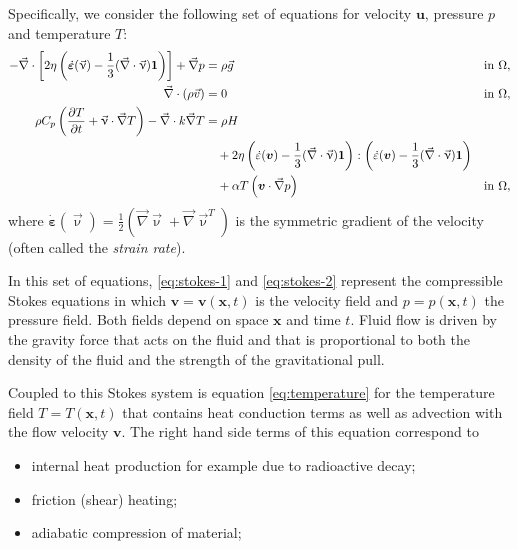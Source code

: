 Specifically, we consider the following set of equations for velocity $\mathbf
u$, pressure $p$ and temperature $T$:
\begin{align}
  \label{eq:stokes-1}
  -\vec\nabla \cdot \left[2\eta \left(\dot{\bm \varepsilon}(\vec \upnu)
                                  - \frac{1}{3}(\vec\nabla \cdot \vec \upnu)\mathbf 1\right)
                \right] + \vec\nabla p &=
  \rho \vec g
  &
  & \textrm{in $\Omega$},
  \\
  \label{eq:stokes-2}
  \vec\nabla \cdot (\rho \vec v) &= 0
  &
  & \textrm{in $\Omega$},
  \\
  \label{eq:temperature}
  \rho C_p \left(\frac{\partial T}{\partial t} + \vec \upnu\cdot\vec\nabla T\right)
  - \vec\nabla\cdot k\vec\nabla T
  &=
  \rho H
  \notag
  \\
  &\quad
  +
  2\eta
  \left(\dot\varepsilon(\bm v) - \frac{1}{3}(\vec\nabla \cdot \vec \upnu)\mathbf 1\right)
  :
  \left(\dot\varepsilon(\bm v) - \frac{1}{3}(\vec\nabla \cdot \vec \upnu)\mathbf 1\right)
  \\
  &\quad
  +\alpha T \left( \bm v \cdot \vec\nabla p \right)
  && \textrm{in $\Omega$},
  \notag
\end{align}
where $\dot{\bm \varepsilon}(\vec\upnu) = \frac{1}{2}(\vec\nabla \vec\upnu + \vec\nabla \vec\upnu^T)$ 
is the symmetric gradient of the velocity (often called the
\textit{strain rate}).%

In this set of equations, \eqref{eq:stokes-1} and \eqref{eq:stokes-2}
represent the compressible Stokes equations in which $\mathbf v=\mathbf
v(\mathbf x,t)$ is the velocity field and $p=p(\mathbf x,t)$ the pressure
field. Both fields depend on space $\mathbf x$ and time $t$. Fluid flow is
driven by the gravity force that acts on the fluid and that is proportional to
both the density of the fluid and the strength of the gravitational pull.

Coupled to this Stokes system is equation \eqref{eq:temperature} for the
temperature field $T=T(\mathbf x,t)$ that contains heat conduction terms as
well as advection with the flow velocity $\mathbf v$. The right hand side
terms of this equation correspond to
\begin{itemize}
\item internal heat production for example due to radioactive decay;
\item friction (shear) heating;
\item adiabatic compression of material;
\end{itemize}

